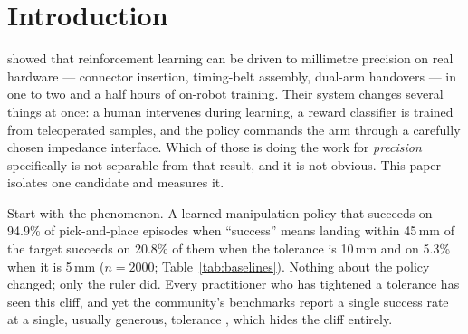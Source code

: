 \documentclass{article}
\newcommand{\planned}[1]{{\color{blue!70!black}\textit{#1}}}
\newcommand{\iface}{\boldsymbol{\theta}}
\begin{document}
\begin{abstract}
often the policy fails outright a good deal more. Evaluating all 38 stored
checkpoints shows the floor is undefined until the task is solved, drops once,
and then oscillates without improving over the last third of training; Xu et
al.'s scaling form does not fit an RL checkpoint curve ($r^2 = 0.17$) and we
report the failure rather than a fitted constant. A nested design of 200 scenes
replayed under 10 noise streams each puts the intra-class correlation of the
outcome at the floor at $0.175$: five parts noise to one part scene.
\planned{The interface sweep, the estimated $c(\iface)$ and the training-based
control arms are pending; see Sec.~\ref{sec:results}.} We release the environment, the trained
checkpoints, per-episode evaluation logs with the sampled randomisation
parameters, and a one-command reproduction script.
\end{abstract}

\section{Introduction}
\label{sec:intro}

\citet{luo2025hilserl} showed that reinforcement learning can be driven to
millimetre precision on real hardware --- connector insertion, timing-belt
assembly, dual-arm handovers --- in one to two and a half hours of on-robot
training. Their system changes several things at once: a human intervenes
during learning, a reward classifier is trained from teleoperated samples, and
the policy commands the arm through a carefully chosen impedance interface.
Which of those is doing the work for \emph{precision} specifically is not
separable from that result, and it is not obvious. This paper isolates one
candidate and measures it.

Start with the phenomenon. A learned manipulation policy that succeeds on
94.9\% of pick-and-place episodes when ``success'' means landing within 45\,mm
of the target succeeds on 20.8\% of them when the tolerance is 10\,mm and on
5.3\% when it is 5\,mm ($n{=}2000$; Table~\ref{tab:baselines}). Nothing about
the policy changed; only the ruler did. Every practitioner who has tightened a
tolerance has seen this cliff, and yet the community's benchmarks report a
single success rate at a single, usually generous, tolerance
\citep{jiang2026benchmarking}, which hides the cliff entirely.
\end{document}
